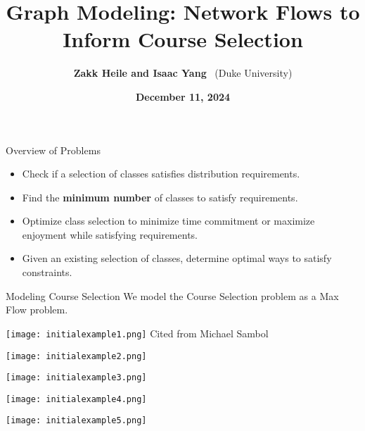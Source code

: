\documentclass{beamer}
\title{\textbf{Graph Modeling: Network Flows to Inform Course Selection}}
\author{\textbf{Zakk Heile and Isaac Yang} \ (Duke University)}
\date{\textbf{December 11, 2024}}
\begin{document}
\begin{frame}
    \titlepage
\end{frame}

\begin{frame}{Overview of Problems}
    \begin{itemize}
        \item Check if a selection of classes satisfies distribution requirements.
        \item Find the \textbf{minimum number} of classes to satisfy requirements.
        \item Optimize class selection to minimize time commitment or maximize enjoyment while satisfying requirements.
        \item Given an existing selection of classes, determine optimal ways to satisfy constraints.
    \end{itemize}
\end{frame}

\begin{frame}{Modeling Course Selection}
    \centering
    \LARGE We model the Course Selection problem as a Max Flow problem.
\end{frame}

\begin{frame}
    \centering
    \texttt{[image: initialexample1.png]}
    \vspace{0.5cm}
    \tiny{Cited from Michael Sambol}
\end{frame}

\begin{frame}
    \centering
    \texttt{[image: initialexample2.png]}
\end{frame}

\begin{frame}
    \centering
    \texttt{[image: initialexample3.png]}
\end{frame}

\begin{frame}
    \centering
    \texttt{[image: initialexample4.png]}
\end{frame}

\begin{frame}
    \centering
    \texttt{[image: initialexample5.png]}
\end{frame}
\end{document}
